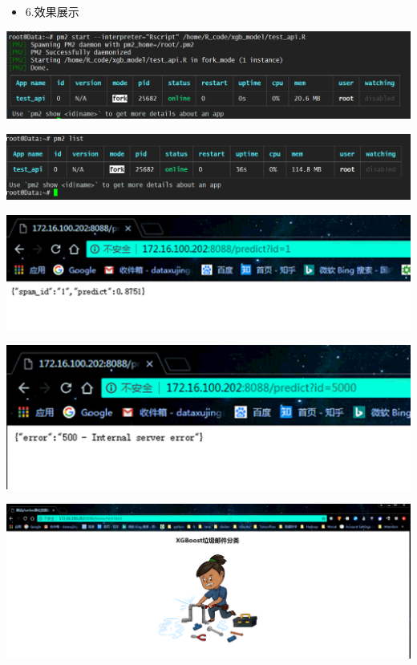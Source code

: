 \documentclass[]{book}
\providecommand{\tightlist}{%
  \setlength{\itemsep}{0pt}\setlength{\parskip}{0pt}}
\begin{document}
\begin{itemize}
\tightlist
\item
  6.效果展示
\end{itemize}

\includegraphics{pic/plumber/1.png}

\includegraphics{pic/plumber/2.png}

\includegraphics{pic/plumber/3.png}

\includegraphics{pic/plumber/4.png}

\includegraphics{pic/plumber/6.png}
\end{document}
